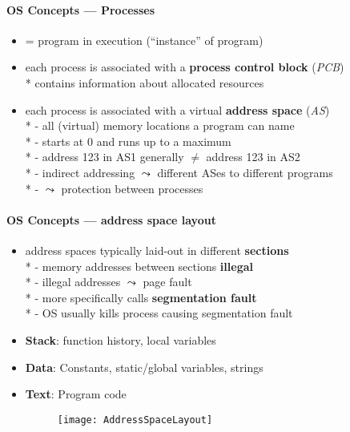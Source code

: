\paragraph{OS Concepts --- Processes}
\begin{itemize}
	\item = program in execution ("`instance"' of program)
	\item each process is associated with a \textbf{process control block} (\emph{PCB})
		\\*
		contains information about allocated resources
	\item each process is associated with a virtual \textbf{address space} (\emph{AS})
		\\*
		- all (virtual) memory locations a program can name
		\\*
		- starts at 0 and runs up to a maximum
		\\*
		- address 123 in AS1 generally \( \neq \) address 123 in AS2
		\\*
		- indirect addressing \( \leadsto \) different ASes to different programs
		\\*
		- \( \leadsto \) protection between processes
\end{itemize}

\paragraph{OS Concepts --- address space layout}
\begin{itemize}
	\item address spaces typically laid-out in different \textbf{sections}
		\\*
		- memory addresses between sections \textbf{illegal}
		\\*
		- illegal addresses \( \leadsto \) page fault
		\\*
		- more specifically calls \textbf{segmentation fault}
		\\*
		- OS usually kills process causing segmentation fault
	\item \textbf{Stack}: function history, local variables
	\item \textbf{Data}: Constants, static/global variables, strings
	\item \textbf{Text}: Program code
	\begin{figure}[h]\centering\label{AddressSpaceLayout}\texttt{[image: AddressSpaceLayout]}\end{figure}
\end{itemize}

